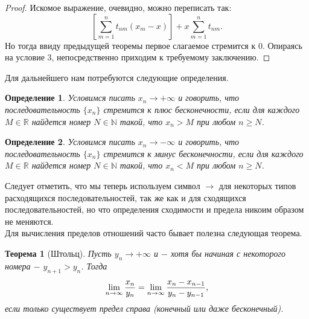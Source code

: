 \documentclass{article}
\newtheorem{theorem}{Теорема}[section]
\newtheorem{definition}{Определение}[section]
\begin{document}
\begin{proof}
Искомое выражение, очевидно, можно переписать так:
\[
\left[\sum\limits_{m = 1}^{n} {t_{nm}(x_m - x)}\right] + x\sum\limits_{m = 1}^{n} {t_{nm}}.
\]
Но тогда ввиду предыдущей теоремы первое слагаемое стремится к \(0\). Опираясь на условие \(\textit{3}\), непосредственно приходим к требуемому заключению.
\end{proof}

Для дальнейшего нам потребуются следующие определения.

\begin{definition}
Условимся писать \(x_n \to + \infty\) и говорить, что последовательность \(\{x_n\}\) стремится к плюс бесконечности, если для каждого \(M \in \mathbb{R}\) найдется номер \(N \in \mathbb{N}\) такой, что \(x_n > M\) при любом \(n \geq N\).
\end{definition}

\begin{definition}
Условимся писать \(x_n \to - \infty\) и говорить, что последовательность \(\{x_n\}\) стремится к минус бесконечности, если для каждого \(M \in \mathbb{R}\) найдется номер \(N \in \mathbb{N}\) такой, что \(x_n < M\) при любом \(n \geq N\).
\end{definition}

Следует отметить, что мы теперь используем символ \(\to\) для некоторых типов расходящихся последовательностей, так же как и для сходящихся последовательностей, но что определения сходимости и предела никоим образом не меняются.
\\

Для вычисления пределов отношений часто бывает полезна следующая теорема.

\begin{theorem}[Штольц]
Пусть \(y_n \to + \infty\) и \(-\) хотя бы начиная с некоторого номера \(-\) \(y_{n + 1} > y_n\). Тогда
\[
\lim\limits_{n \to \infty}{x_n \over y_n} = \lim\limits_{n \to \infty}{{x_n - x_{n - 1}} \over {y_n - y_{n - 1}}},
\]
если только существует предел справа (конечный или даже бесконечный).
\end{theorem}
\end{document}
